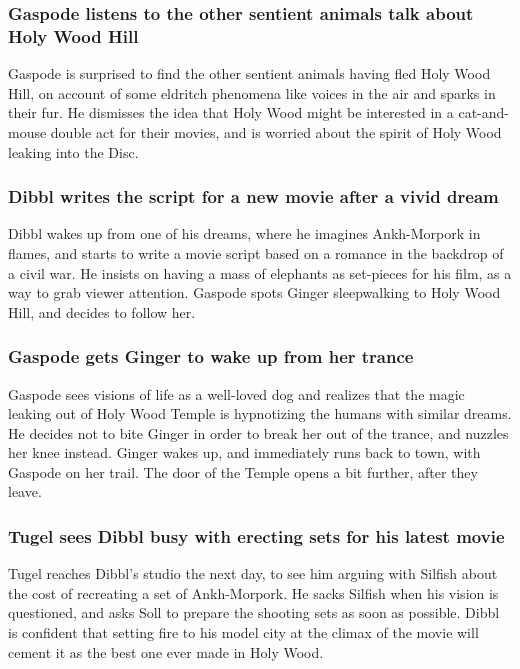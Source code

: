 \subsubsection{\Gls{Gaspode} listens to the other sentient animals talk about Holy Wood Hill}
\Gls{Gaspode} is surprised to find the other sentient animals having fled Holy Wood Hill, on account
of some eldritch phenomena like voices in the air and sparks in their fur. He dismisses the idea
that Holy Wood might be interested in a cat-and-mouse double act for their movies, and is worried
about the spirit of Holy Wood leaking into the Disc.

\subsubsection{\Gls{Dibbl} writes the script for a new movie after a vivid dream}
\Gls{Dibbl} wakes up from one of his dreams, where he imagines Ankh-Morpork in flames, and starts
to write a movie script based on a romance in the backdrop of a civil war. He insists on having a
mass of elephants as set-pieces for his film, as a way to grab viewer attention. \Gls{Gaspode} spots
\Gls{Ginger} sleepwalking to Holy Wood Hill, and decides to follow her.

\subsubsection{\Gls{Gaspode} gets \Gls{Ginger} to wake up from her trance}
\Gls{Gaspode} sees visions of life as a well-loved dog and realizes that the magic leaking out of
Holy Wood Temple is hypnotizing the humans with similar dreams. He decides not to bite \Gls{Ginger}
in order to break her out of the trance, and nuzzles her knee instead. \Gls{Ginger} wakes up, and
immediately runs back to town, with \Gls{Gaspode} on her trail. The door of the Temple opens a
bit further, after they leave.

\subsubsection{\Gls{Tugel} sees \Gls{Dibbl} busy with erecting sets for his latest movie}
\Gls{Tugel} reaches \Gls{Dibbl}'s studio the next day, to see him arguing with \Gls{Silfish} about
the cost of recreating a set of Ankh-Morpork. He sacks \Gls{Silfish} when his vision is questioned,
and asks \Gls{Soll} to prepare the shooting sets as soon as possible. \Gls{Dibbl} is confident that
setting fire to his model city at the climax of the movie will cement it as the best one ever made
in Holy Wood.

